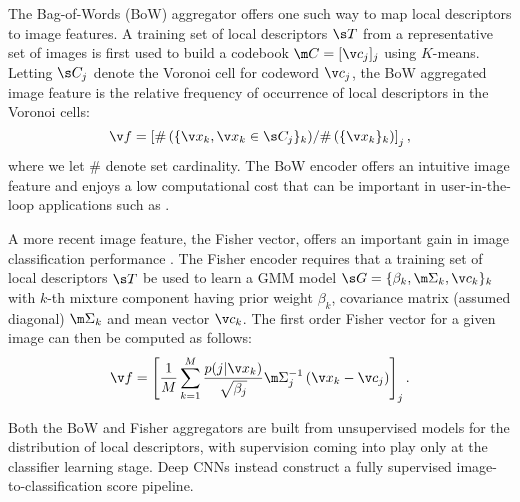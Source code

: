 \documentclass{article}
\begin{document}
The Bag-of-Words (BoW) aggregator offers one such way to map local descriptors to image features. A training set of local descriptors $\s T$ from a representative set of images is first used to build a codebook $\m C = [\v c_j]_j$ using $K$-means. Letting $\s C_j$ denote the Voronoi cell for codeword $\v c_j$, the BoW aggregated image feature is the relative frequency of occurrence of local descriptors in the Voronoi cells: 
\begin{equation}\label{eqn:BoW}
\v f = \left [ {\# \left ( \{\v x_k, \v x_k \in \s C_j\}_k \right )} / {\# \left (\{\v x_k\}_k \right )} \right ]_j,
\end{equation}
where we let $\#$ denote set cardinality. The BoW encoder offers an intuitive image feature and enjoys a low computational cost that can be important in user-in-the-loop applications such as \cite{Parkhi}. 

A more recent image feature, the Fisher vector, offers an important gain in image classification performance \cite{Chatfield2011}. The Fisher encoder requires that a training set of local descriptors $\s T$ be used to learn a GMM model $\s G=\{\beta_k,\m \Sigma_k, \v c_k\}_k$ with $k$-th mixture component having prior weight $\beta_k$, covariance matrix (assumed diagonal) $\m \Sigma_k$ and mean vector $\v c_k$. The first order Fisher vector for a given image can then be computed as follows:
\begin{equation}
\label{eqn:Fisher}
\v f = \left [ \frac{1}{M}\sum_{k=1}^M \frac{p(j|\v x_k)}{\sqrt{\beta_j}} \m \Sigma_j^{-1} \left ( \v x_k - \v c_j \right ) \right ]_j.
\end{equation}


Both the BoW and Fisher aggregators are built from unsupervised models for the distribution of local descriptors, with supervision coming into play only at the classifier learning stage. Deep CNNs instead construct a fully supervised image-to-classification score pipeline.
\end{document}
